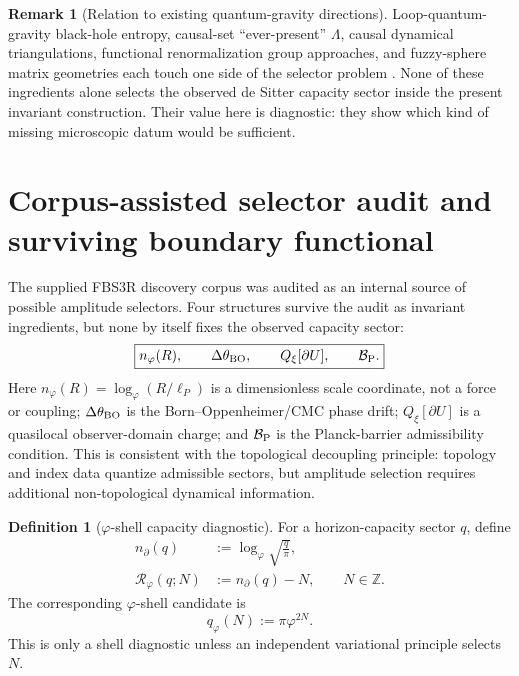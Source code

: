 \documentclass[aps,prd,reprint,nofootinbib,superscriptaddress,floatfix]{revtex4-2}
\numberwithin{equation}{section}
\theoremstyle{definition}
\newtheorem{definition}{Definition}[section]
\newtheorem{remark}{Remark}[section]
\theoremstyle{plain}
\begin{document}
\begin{remark}[Relation to existing quantum-gravity directions]
Loop-quantum-gravity black-hole entropy, causal-set ``ever-present'' \(\Lambda\), causal dynamical triangulations, functional renormalization group approaches, and fuzzy-sphere matrix geometries each touch one side of the selector problem \cite{Rovelli1996,Ashtekar1998,Jacobson2007,DiazPoloPranzetti2011,BarberoPranzetti2022,Sorkin2007,Zwane2017,Loll2020,Saueressig2023,Hasebe2025}.  None of these ingredients alone selects the observed de Sitter capacity sector inside the present invariant construction.  Their value here is diagnostic: they show which kind of missing microscopic datum would be sufficient.
\end{remark}



\section{Corpus-assisted selector audit and surviving boundary functional}
\label{sec:corpus-selector}

The supplied FBS3R discovery corpus was audited as an internal source of possible
amplitude selectors.  Four structures survive the audit as invariant ingredients,
but none by itself fixes the observed capacity sector:
\begin{equation}
\boxed{
n_\varphi(R),\qquad
\Delta\theta_{\rm BO},\qquad
Q_\xi[\partial U],\qquad
\mathcal B_{\rm P}.
}
\end{equation}
Here \(n_\varphi(R)=\log_\varphi(R/\ell_P)\) is a dimensionless scale
coordinate, not a force or coupling; \(\Delta\theta_{\rm BO}\) is the
Born--Oppenheimer/CMC phase drift; \(Q_\xi[\partial U]\) is a quasilocal
observer-domain charge; and \(\mathcal B_{\rm P}\) is the Planck-barrier
admissibility condition.  This is consistent with the topological decoupling
principle: topology and index data quantize admissible sectors, but amplitude
selection requires additional non-topological dynamical information.

\begin{definition}[\(\varphi\)-shell capacity diagnostic]
For a horizon-capacity sector \(q\), define
\begin{align}
n_\partial(q)&:=\log_\varphi\sqrt{\frac{q}{\pi}},\\
\mathcal R_\varphi(q;N)&:=n_\partial(q)-N,\qquad N\in\mathbb Z .
\end{align}
The corresponding \(\varphi\)-shell candidate is
\begin{equation}
q_\varphi(N):=\pi\varphi^{2N}.
\end{equation}
This is only a shell diagnostic unless an independent variational principle
selects \(N\).
\end{definition}
\end{document}
